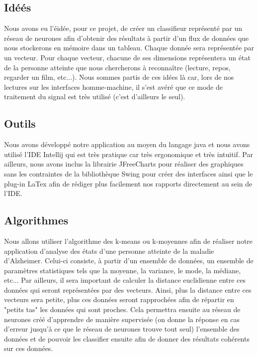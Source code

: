 		\subsection{Idéés} %
		\label{sub:idéés}
		
		Nous avons eu l'éidée, pour ce projet, de créer un classifieur représenté par un réseau de neurones afin d'obtenir des résultats à partir d'un flux de données que nous stockerons en mémoire dans un tableau. Chaque donnée sera représentée par un vecteur. Pour chaque vecteur, chacune de ses dimensions représentera un état de la personne atteinte que nous chercherons à reconnaître (lecture, repos, regarder un film, etc...). Nous sommes partis de ces idées là car, lors de nos lectures sur les interfaces homme-machine, il s'est avéré que ce mode de traitement du signal est très utilisé (c'est d'ailleurs le seul).
		
		\subsection{Outils} %
		\label{sub:outils}
		
		Nous avons développé notre application au moyen du langage java et nous avons utilisé l'IDE Intellij qui est très pratique car très ergonomique et très intuitif. Par ailleurs, nous avons inclus la librairie JFreeCharts pour réaliser des graphiques sans les contraintes de la bibliothèque Swing pour créer des interfaces ainsi que le plug-in LaTex afin de rédiger plus facilement nos rapports directement au sein de l'IDE.
		
		\subsection{Algorithmes} %
		\label{sub:algorithmes}
		
		Nous allons utiliser l'algorithme des k-means ou k-moyennes afin de réaliser notre application d'analyse des états d'une personne atteinte de la maladie d'Alzheimer. Celui-ci consiste, à partir d'un ensemble de données, un ensemble de paramètres statistiques tels que la moyenne, la variance, le mode, la médiane, etc... Par ailleurs, il sera important de calculer la distance euclidienne entre ces données qui seront représentées par des vecteurs. Ainsi, plus la distance entre ces vecteurs sera petite, plus ces données seront rapprochées afin de répartir en "petits tas" les données qui sont proches. Cela permettra ensuite au réseau de neurones créé d'apprendre de manière supervisée (on donne la réponse en cas d'erreur jusqu'à ce que le réseau de neurones trouve tout seul) l'ensemble des données et de pouvoir les classifier ensuite afin de donner des résultats cohérents sur ces données. 
		
